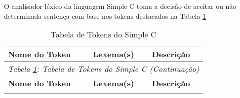 \documentclass[12pt,a4paper]{article}
\begin{document}
O analisador léxico da linguagem Simple C toma a decisão de aceitar ou não determinada sentença com base nos tokens destacados na Tabela \ref{tab:tokens}

\begin{longtable}{lll}
\caption{Tabela de Tokens do Simple C}
\label{tab:tokens} \\

\toprule
\textbf{Nome do Token} & \textbf{Lexema(s)} & \textbf{Descrição} \\
\midrule
\endfirsthead

\toprule
\multicolumn{3}{l}{\small\textit{Tabela \ref{tab:tokens}: Tabela de Tokens do Simple C (Continuação)}} \\
\textbf{Nome do Token} & \textbf{Lexema(s)} & \textbf{Descrição} \\
\midrule
\endhead

\bottomrule
\endlastfoot


\end{longtable}
\end{document}
